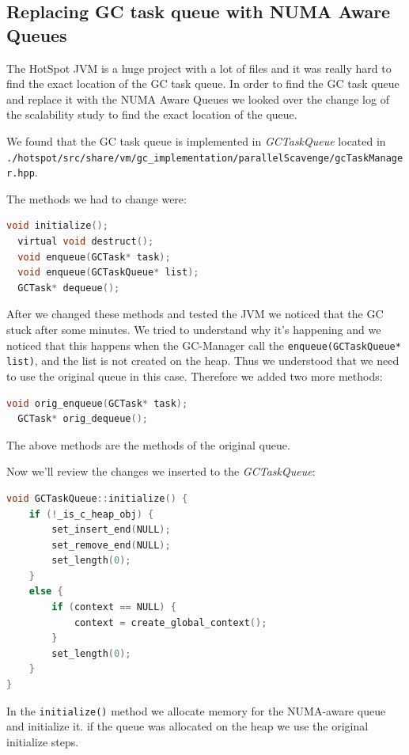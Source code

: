 \documentclass{article}
\begin{document}
 \newpage

 \subsection{Replacing GC task queue with NUMA Aware Queues}
 The HotSpot JVM is a huge project with a lot of files and it was really hard to find the exact location of the GC task queue.
 In order to find the GC task queue and replace it with the NUMA Aware Queues we looked over the change log of the scalability study\cite{paper} to find the exact location of the queue.

 We found that the GC task queue is implemented in \textit{GCTaskQueue} located in \texttt{./hotspot/src/share/vm/gc\_implementation/parallelScavenge/gcTaskManager.hpp}.

 The methods we had to change were:
 \begin{lstlisting}[language=C]
  void initialize();
  virtual void destruct();
  void enqueue(GCTask* task);
  void enqueue(GCTaskQueue* list);
  GCTask* dequeue();
 \end{lstlisting}

 After we changed these methods and tested the JVM we noticed that the GC stuck after some minutes.
 We tried to understand why it's happening and we noticed that this happens when the GC-Manager call the \lstinline{enqueue(GCTaskQueue* list)}, and the list is not created on the heap. Thus we understood that we need to use the original queue in this case.
 Therefore we added two more methods:

 \begin{lstlisting}[language=C]
  void orig_enqueue(GCTask* task);
  GCTask* orig_dequeue();
 \end{lstlisting}

 The above methods are the methods of the original queue.

 Now we'll review the changes we inserted to the \textit{GCTaskQueue}:

 \begin{lstlisting}[language=C]
void GCTaskQueue::initialize() {
    if (!_is_c_heap_obj) {
        set_insert_end(NULL);
        set_remove_end(NULL);
        set_length(0);
    }
    else {
        if (context == NULL) {
            context = create_global_context();
        }
        set_length(0);
    }
}
 \end{lstlisting}

 In the \lstinline{initialize()} method we allocate memory for the NUMA-aware queue and initialize it. if the queue was allocated on the heap we use the original initialize steps.
\end{document}
